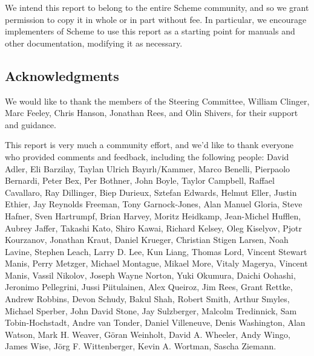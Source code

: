 \medskip

We intend this report to belong to the entire Scheme community, and so
we grant permission to copy it in whole or in part without fee.  In
particular, we encourage implementers of Scheme to use this report as
a starting point for manuals and other documentation, modifying it as
necessary.




\subsection*{Acknowledgments}

We would like to thank the members of the Steering Committee, William
Clinger, Marc Feeley, Chris Hanson, Jonathan Rees, and Olin Shivers, for
their support and guidance.

This report is very much a community effort, and we'd like to
thank everyone who provided comments and feedback, including
the following people: David Adler, Eli Barzilay, Taylan Ulrich
Bay\i{}rl\i/Kammer, Marco Benelli, Pierpaolo Bernardi,
Peter Bex, Per Bothner, John Boyle, Taylor Campbell, Raffael Cavallaro,
Ray Dillinger, Biep Durieux, Sztefan Edwards, Helmut Eller, Justin
Ethier, Jay Reynolds Freeman, Tony Garnock-Jones, Alan Manuel Gloria,
Steve Hafner, Sven Hartrumpf, Brian Harvey, Moritz Heidkamp, Jean-Michel
Hufflen, Aubrey Jaffer, Takashi Kato, Shiro Kawai, Richard Kelsey, Oleg
Kiselyov, Pjotr Kourzanov, Jonathan Kraut, Daniel Krueger, Christian
Stigen Larsen, Noah Lavine, Stephen Leach, Larry D. Lee, Kun Liang,
Thomas Lord, Vincent Stewart Manis, Perry Metzger, Michael Montague,
Mikael More, Vitaly Magerya, Vincent Manis, Vassil Nikolov, Joseph
Wayne Norton, Yuki Okumura, Daichi Oohashi, Jeronimo Pellegrini, Jussi
Piitulainen, Alex Queiroz, Jim Rees, Grant Rettke, Andrew Robbins, Devon
Schudy, Bakul Shah, Robert Smith, Arthur Smyles, Michael Sperber, John
David Stone, Jay Sulzberger, Malcolm Tredinnick, Sam Tobin-Hochstadt,
Andre van Tonder, Daniel Villeneuve, Denis Washington, Alan Watson,
Mark H.  Weaver, G\"oran Weinholt, David A. Wheeler, Andy Wingo, James
Wise, J\"org F. Wittenberger, Kevin A. Wortman, Sascha Ziemann.

